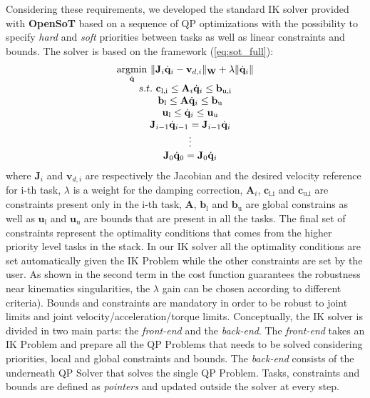 Considering these requirements, we developed the standard IK solver provided with \textbf{OpenSoT} based on a sequence of QP optimizations with the possibility to specify \emph{hard} and \emph{soft} priorities between tasks as well as linear constraints and bounds. 
The solver is based on the framework (\ref{eq:sot_full}):
\begin{equation} 
\label{optimization_problem2}
\begin{array}{c}
\underset{\dot{\mathbf{q}}}{\operatorname{argmin}} \ \Arrowvert \mathbf{J}_i \dot{\mathbf{q}}_i-\mathbf{v}_{d,i} \Arrowvert_{\mathbf{W}} + \lambda \Arrowvert \dot{\mathbf{q}}_i \Arrowvert\\
s.t. \ \mathbf{c}_\text{l,i} \leq \mathbf{A}_i\dot{\mathbf{q}}_i \leq \mathbf{b}_\text{u,i}\\
\ \ \ \mathbf{b}_\text{l} \leq \mathbf{A}\dot{\mathbf{q}}_i \leq \mathbf{b}_\text{u}\\
\ \ \ \mathbf{u}_\text{l} \leq \dot{\mathbf{q}}_i \leq \mathbf{u}_\text{u}\\
\ \ \ \mathbf{J}_{i-1}\dot{\mathbf{q}}_{i-1} = \mathbf{J}_{i-1}\dot{\mathbf{q}}_i\\
\ \ \ \vdots \\
\ \ \ \mathbf{J}_{0}\dot{\mathbf{q}}_{0} = \mathbf{J}_{0}\dot{\mathbf{q}}_i
\end{array}
\end{equation}
where $\mathbf{J}_i$ and $\mathbf{v}_{d,i}$ are respectively the Jacobian and the desired velocity reference for i-th task, $\lambda$ is a weight for the damping correction, $\mathbf{A}_i$, $\mathbf{c}_\text{l,i}$ and $\mathbf{c}_\text{u,i}$ are constraints present only in the i-th task, $\mathbf{A}$, $\mathbf{b}_\text{l}$ and $\mathbf{b}_\text{u}$ are global constrains as well as $\mathbf{u}_\text{l}$ and $\mathbf{u}_\text{u}$ are bounds that are present in all the tasks. 
The final set of constraints represent the optimality conditions that comes from the higher priority level tasks in the stack. In our IK solver all the optimality conditions are set automatically given the IK Problem while the other constraints are set by the user.
As shown in \cite{nakamura1990-tp} the second term in the cost function guarantees the robustness near kinematics singularities, the $\lambda$ gain can be chosen according to different criteria). Bounds and constraints are mandatory in order to be robust to joint limits and joint velocity/acceleration/torque limits.
Conceptually, the IK solver is divided in two main parts: the \emph{front-end} and the \emph{back-end}.
The \emph{front-end} takes an IK Problem and prepare all the QP Problems that needs to be solved considering priorities, local and global constraints and bounds. The \emph{back-end} consists of the underneath QP Solver that solves the single QP Problem. Tasks, constraints and bounds are defined as \emph{pointers} and updated outside the solver at every step.

